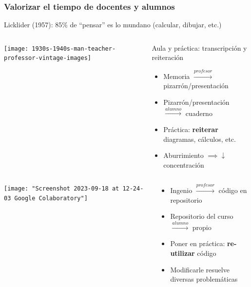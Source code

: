 \documentclass[aspectratio=43]{beamer}
\begin{document}
\begin{frame}
	\frametitle{Valorizar el tiempo de docentes y alumnos}
	Licklider (1957): 85\% de ``pensar'' es lo mundano (calcular, dibujar, etc.)
	\pause
	\begin{block}{}
	  \begin{columns}[b]
			\begin{column}{0.3\textwidth}
				\texttt{[image: 1930s-1940s-man-teacher-professor-vintage-images]}
			\end{column}
			\begin{column}{0.65\textwidth}
				Aula y práctica: transcripción y reiteración
				\begin{itemize}[<+->]
					\item Memoria \(\xrightarrow{profesor}\) pizarrón/presentación
					\item Pizarrón/presentación \(\xrightarrow{alumno}\) cuaderno
					\item Práctica: \textbf{reiterar} diagramas, cálculos, etc.
					\item Aburrimiento \(\implies \downarrow\) concentración
				\end{itemize}
			\end{column}
		\end{columns}
	\end{block}
	\pause
	\begin{block}{}
	  \begin{columns}[b]
			\begin{column}{0.3\textwidth}
				\texttt{[image: "Screenshot 2023-09-18 at 12-24-03 Google Colaboratory"]}
			\end{column}
			\begin{column}{0.65\textwidth}
				\begin{itemize}[<+->]
					\item Ingenio \(\xrightarrow{profesor}\) código en repositorio
					\item Repositorio del curso \(\xrightarrow{alumno}\) propio
					\item Poner en práctica: \textbf{re-utilizar} código
					\item Modificarle resuelve diversas problemáticas
				\end{itemize}
			\end{column}
		\end{columns}
	\end{block}
\end{frame}
\end{document}
